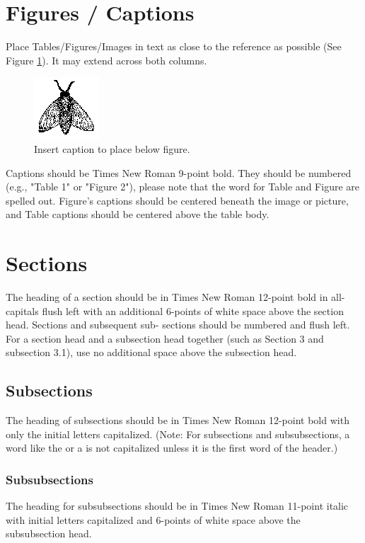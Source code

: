\documentclass[acmtog, authorversion]{acmart}
\begin{document}
\section{Figures / Captions}
Place Tables/Figures/Images in text as close to the reference as possible 
(See Figure \ref{fig:abc}).  It may extend across both columns. 


\begin{figure}
    \centering
  \includegraphics{fly2.eps}
  \caption{Insert caption to place below figure.}
  \label{fig:abc}
\end{figure}

Captions should be Times New Roman 9-point bold.  They should be numbered (e.g., "Table 1" or "Figure 2"), please note that the word for Table and Figure are spelled out. Figure's captions should be centered beneath the image or picture, and Table captions should be centered above the table body.

\section{Sections}
The heading of a section should be in Times New Roman 12-point bold in all-capitals flush left with an additional 6-points of white space above the section head.  Sections and subsequent sub- sections should be numbered and flush left. For a section head and a subsection head together (such as Section 3 and subsection 3.1), use no additional space above the subsection head.

\subsection{Subsections}
The heading of subsections should be in Times New Roman 12-point bold with only the initial letters capitalized. (Note: For subsections and subsubsections, a word like the or a is not capitalized unless it is the first word of the header.)

\subsubsection{Subsubsections}
The heading for subsubsections should be in Times New Roman 11-point italic with initial letters capitalized and 6-points of white space above the subsubsection head.
\end{document}
